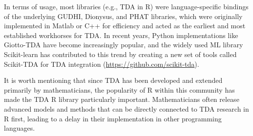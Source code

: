 In terms of usage, most libraries (e.g., TDA in R) were language-specific bindings of the underlying GUDHI, Dionysus, and PHAT libraries, which were originally implemented in Matlab or C++ for efficiency and acted as the earliest and most established workhorses for TDA. In recent years, Python implementations like Giotto-TDA have become increasingly popular, and the widely used ML library Scikit-learn has contributed to this trend by creating a new set of tools called Scikit-TDA for TDA integration ({\small \url{https://github.com/scikit-tda}}). 

It is worth mentioning that since TDA has been developed and extended primarily by mathematicians, the popularity of R within this community has made the TDA R library particularly important. Mathematicians often release advanced models and methods that can be directly connected to TDA research in R first, leading to a delay in their implementation in other programming languages.


\begin{table}[h!]
  \caption{\textbf{Software Libraries for Persistent Homology.} In the data column, P indicates support for Point cloud data, I for Image data, and N for Network (graph) data.}
    \label{tab:libraries}
    \centering
\end{table}
